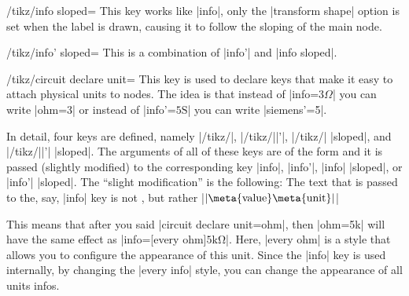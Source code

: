 \begin{key}{/tikz/info sloped=}
  This key works like |info|, only the |transform shape| option is set
  when the label is drawn, causing it to follow the sloping of the
  main node.
\begin{codeexample}[]
\end{codeexample}
\end{key}

\begin{key}{/tikz/info' sloped=}
  This is a combination of |info'| and |info sloped|.
\begin{codeexample}[]
\end{codeexample}
\end{key}

\begin{key}{/tikz/circuit declare unit=}
  This key is used to declare keys that make it easy to attach
  physical units to nodes. The idea is that instead of
  |info=$3\Omega$| you can write |ohm=3| or instead of
  |info'=$5\mathrm{S}$| you can write |siemens'=5|.

  In detail, four keys are defined, namely |/tikz/|,
  |/tikz/||'|, |/tikz/| |sloped|, and
  |/tikz/||'| |sloped|. The arguments of all of these keys
  are of the form
   and it is
  passed (slightly modified) to the corresponding key |info|, |info'|,
  |info| |sloped|, or |info'| |sloped|. The ``slight modification'' is the
  following: The text that is passed to the, say, |info| key is not
  , but rather |$\mathrm{|\meta{value}\meta{unit}|}$|

  This means that after you said |circuit declare unit={ohm}{\Omega}|,
  then |ohm=5k| will have the same effect as
  |info={[every ohm]$\mathrm{5k\Omega}$}|. Here, |every ohm| is a
  style that allows you to configure the appearance of this unit.
  Since the |info| key is used internally, by changing the
  |every info| style, you can change the appearance of all units
  infos.
\begin{codeexample}[]
\end{codeexample}
\end{key}


